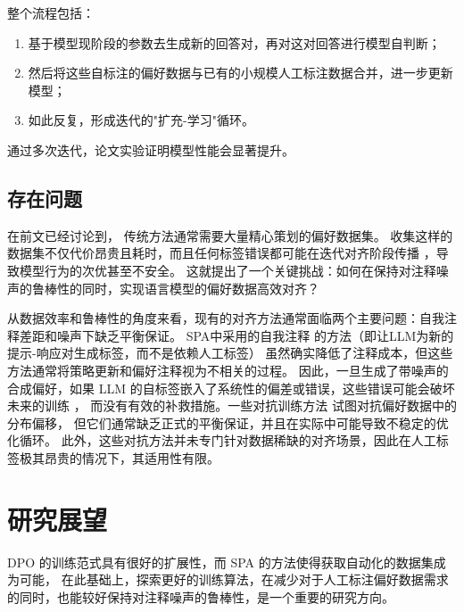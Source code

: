 整个流程包括：
\begin{enumerate}
    \item 基于模型现阶段的参数去生成新的回答对，再对这对回答进行模型自判断；
    \item 然后将这些自标注的偏好数据与已有的小规模人工标注数据合并，进一步更新模型；
    \item 如此反复，形成迭代的"扩充-学习"循环。
\end{enumerate}
通过多次迭代，论文实验证明模型性能会显著提升。

\subsection{存在问题}

在前文已经讨论到，
传统方法通常需要大量精心策划的偏好数据集。
收集这样的数据集不仅代价昂贵且耗时，而且任何标签错误都可能在迭代对齐阶段传播 \citep{Casper2023Open}，导致模型行为的次优甚至不安全。
这就提出了一个关键挑战：如何在保持对注释噪声的鲁棒性的同时，实现语言模型的偏好数据高效对齐？

从数据效率和鲁棒性的角度来看，现有的对齐方法通常面临两个主要问题：自我注释差距和噪声下缺乏平衡保证。
SPA中采用的自我注释 \citep{Lee2024Rlaif,Yuan2024Self,Kim2025Spread}的方法（即让LLM为新的提示-响应对生成标签，而不是依赖人工标签）
虽然确实降低了注释成本，但这些方法通常将策略更新和偏好注释视为不相关的过程。
因此，一旦生成了带噪声的合成偏好，如果 LLM 的自标签嵌入了系统性的偏差或错误，这些错误可能会破坏未来的训练 \citep{Chowdhury2024Provably}，
而没有有效的补救措施。一些对抗训练方法 \citep{Cheng2023Adversarial,Wu2024Towards} 试图对抗偏好数据中的分布偏移，
但它们通常缺乏正式的平衡保证，并且在实际中可能导致不稳定的优化循环。
此外，这些对抗方法并未专门针对数据稀缺的对齐场景，因此在人工标签极其昂贵的情况下，其适用性有限。

\section{研究展望}

DPO 的训练范式具有很好的扩展性，而 SPA 的方法使得获取自动化的数据集成为可能，
在此基础上，探索更好的训练算法，在减少对于人工标注偏好数据需求的同时，也能较好保持对注释噪声的鲁棒性，是一个重要的研究方向。


